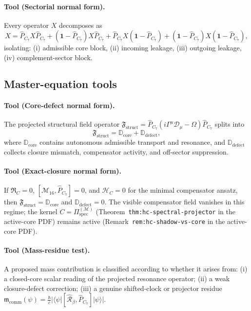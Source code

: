 \paragraph{Tool (Sectorial normal form).}
Every operator $X$ decomposes as
\[
  X = \hat{P}_{C_7}X\hat{P}_{C_7}
    + (\mathbf{1}-\hat{P}_{C_7})X\hat{P}_{C_7}
    + \hat{P}_{C_7}X(\mathbf{1}-\hat{P}_{C_7})
    + (\mathbf{1}-\hat{P}_{C_7})X(\mathbf{1}-\hat{P}_{C_7}),
\]
isolating: (i) admissible core block, (ii) incoming leakage,
(iii) outgoing leakage, (iv) complement-sector block.

\subsection*{Master-equation tools}

\paragraph{Tool (Core-defect normal form).}
The projected structural field operator
$\mathfrak{F}_{\mathrm{struct}}
= \hat{P}_{C_7}(i\Gamma^\mu\mathcal{D}_\mu - \Omega)\hat{P}_{C_7}$
splits into
\[
  \mathfrak{F}_{\mathrm{struct}}
  = \mathbb{D}_{\mathrm{core}} + \mathbb{D}_{\mathrm{defect}},
\]
where $\mathbb{D}_{\mathrm{core}}$ contains autonomous admissible
transport and resonance, and $\mathbb{D}_{\mathrm{defect}}$ collects
closure mismatch, compensator activity, and off-sector suppression.

\paragraph{Tool (Exact-closure normal form).}
If $\mathfrak{R}_C = 0$, $[\mathcal{M}_{16},\hat{P}_{C_7}] = 0$, and
$\mathcal{H}_C = 0$ for the minimal compensator ansatz, then
$\mathfrak{F}_{\mathrm{struct}} = \mathbb{D}_{\mathrm{core}}$ and
$\mathbb{D}_{\mathrm{defect}} = 0$.
The visible compensator field vanishes in this regime; the kernel
$C = \Pi^{(\mathcal{M})}_{\mathrm{spec}}$
(Theorem~\texttt{thm:hc-spectral-projector} in the active-core PDF) remains active
(Remark~\texttt{rem:hc-shadow-vs-core} in the active-core PDF).

\paragraph{Tool (Mass-residue test).}
A proposed mass contribution is classified according to whether it
arises from: (i) a closed-core scalar reading of the projected resonance
operator; (ii) a weak closure-defect correction; (iii) a genuine
shifted-clock or projector residue
$\mathfrak{m}_{\mathrm{comm}}(\psi)
= \frac{\hbar}{c}|\langle\psi|[\hat{\mathcal{R}}_\beta,\hat{P}_{C_7}]|\psi\rangle|$.

